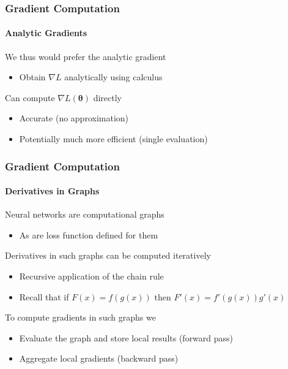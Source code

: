 \documentclass[xetex,professionalfont]{beamer}
\renewcommand\emph[1]{\textcolor{tuwcvl_cvl_blue}{#1}}
\newcommand{\bth}{\boldsymbol{\theta}}
\begin{document}
\begin{frame}
\frametitle{Gradient Computation}
\framesubtitle{Analytic Gradients}

We thus would prefer the \emph{analytic gradient}
\begin{itemize}
    \item Obtain $\nabla L$ analytically using calculus %
\end{itemize}

\bigskip

Can compute $\nabla L(\bth)$ directly
\begin{itemize}
    \item Accurate (no approximation) %
    \item Potentially much more efficient (single evaluation) %
\end{itemize}

\end{frame}


\begin{frame}
\frametitle{Gradient Computation}
\framesubtitle{Derivatives in Graphs}

Neural networks are computational graphs
\begin{itemize}
    \item As are loss function defined for them
\end{itemize}

\bigskip

Derivatives in such graphs can be computed iteratively
\begin{itemize}
    \item Recursive application of the chain rule
    \item Recall that if $F(x)=f(g(x))$ then $F'(x)=f'(g(x))g'(x)$
\end{itemize}

\bigskip

To compute gradients in such graphs we
\begin{itemize}
    \item Evaluate the graph and store local results (\emph{forward pass})
    \item Aggregate local gradients (\emph{backward pass})
\end{itemize}

\end{frame}
\end{document}
